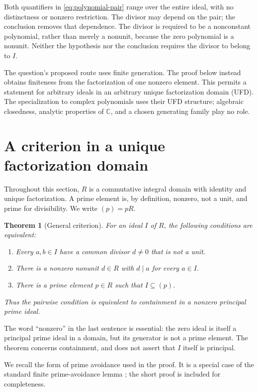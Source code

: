 \documentclass[11pt]{article}
\newtheorem{theorem}{Theorem}[section]
\theoremstyle{remark}
\newcommand{\C}{\mathbb{C}}
\begin{document}
Both quantifiers in \eqref{eq:polynomial-pair} range over the entire
ideal, with no distinctness or nonzero restriction. The divisor may
depend on the pair; the conclusion removes that dependence. The
divisor is required to be a nonconstant polynomial, rather than merely
a nonunit, because the zero polynomial is a nonunit. Neither the
hypothesis nor the conclusion requires the divisor to belong to $I$.

The question's proposed route uses finite generation. The proof below
instead obtains finiteness from the factorization of one nonzero
element. This permits a statement for arbitrary ideals in an arbitrary
unique factorization domain (UFD). The specialization to complex
polynomials uses their UFD structure; algebraic closedness, analytic
properties of $\C$, and a chosen generating family play no role.

\section{A criterion in a unique factorization domain}

Throughout this section, $R$ is a commutative integral domain with
identity and unique factorization. A prime element is, by definition,
nonzero, not a unit, and prime for divisibility. We write $(p)=pR$.

\begin{theorem}[General criterion]\label{thm:ufd}
For an ideal $I$ of $R$, the following conditions are equivalent:
\begin{enumerate}
  \item Every $a,b\in I$ have a common divisor $d\ne0$ that is not a unit.
  \item There is a nonzero nonunit $d\in R$ with $d\mid a$ for every
    $a\in I$.
  \item There is a prime element $p\in R$ such that $I\subseteq(p)$.
\end{enumerate}
Thus the pairwise condition is equivalent to containment in a
\emph{nonzero principal prime ideal}.
\end{theorem}

The word ``nonzero'' in the last sentence is essential: the zero ideal
is itself a principal prime ideal in a domain, but its generator is
not a prime element. The theorem concerns containment, and does not
assert that $I$ itself is principal.

We recall the form of prime avoidance used in the proof. It is a
special case of the standard finite prime-avoidance lemma
\cite{stacks}; the short proof is included for completeness.
\end{document}
